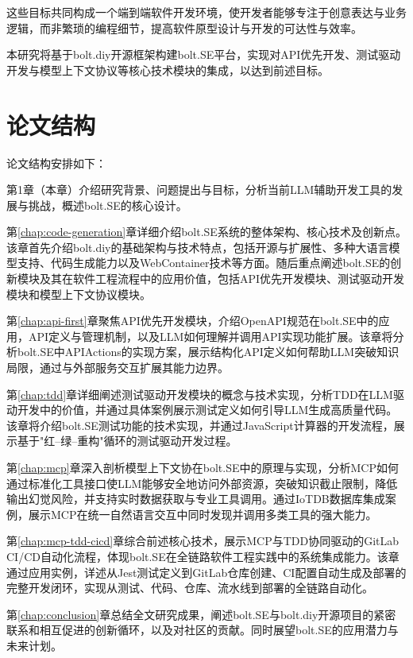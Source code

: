这些目标共同构成一个端到端软件开发环境，使开发者能够专注于创意表达与业务逻辑，而非繁琐的编程细节，提高软件原型设计与开发的可达性与效率。

本研究将基于bolt.diy开源框架构建bolt.SE平台，实现对API优先开发、测试驱动开发与模型上下文协议等核心技术模块的集成，以达到前述目标。

\section{论文结构}
论文结构安排如下：

第1章（本章）介绍研究背景、问题提出与目标，分析当前LLM辅助开发工具的发展与挑战，概述bolt.SE的核心设计。

第\ref{chap:code-generation}章详细介绍bolt.SE系统的整体架构、核心技术及创新点。该章首先介绍bolt.diy的基础架构与技术特点，包括开源与扩展性、多种大语言模型支持、代码生成能力以及WebContainer技术等方面。随后重点阐述bolt.SE的创新模块及其在软件工程流程中的应用价值，包括API优先开发模块、测试驱动开发模块和模型上下文协议模块。

第\ref{chap:api-first}章聚焦API优先开发模块，介绍OpenAPI规范在bolt.SE中的应用，API定义与管理机制，以及LLM如何理解并调用API实现功能扩展。该章将分析bolt.SE中APIActions的实现方案，展示结构化API定义如何帮助LLM突破知识局限，通过与外部服务交互扩展其能力边界。

第\ref{chap:tdd}章详细阐述测试驱动开发模块的概念与技术实现，分析TDD在LLM驱动开发中的价值，并通过具体案例展示测试定义如何引导LLM生成高质量代码。该章将介绍bolt.SE测试功能的技术实现，并通过JavaScript计算器的开发流程，展示基于"红–绿–重构"循环的测试驱动开发过程。

第\ref{chap:mcp}章深入剖析模型上下文协在bolt.SE中的原理与实现，分析MCP如何通过标准化工具接口使LLM能够安全地访问外部资源，突破知识截止限制，降低输出幻觉风险，并支持实时数据获取与专业工具调用。通过IoTDB数据库集成案例，展示MCP在统一自然语言交互中同时发现并调用多类工具的强大能力。

第\ref{chap:mcp-tdd-cicd}章综合前述核心技术，展示MCP与TDD协同驱动的GitLab CI/CD自动化流程，体现bolt.SE在全链路软件工程实践中的系统集成能力。该章通过应用实例，详述从Jest测试定义到GitLab仓库创建、CI配置自动生成及部署的完整开发闭环，实现从测试、代码、仓库、流水线到部署的全链路自动化。

第\ref{chap:conclusion}章总结全文研究成果，阐述bolt.SE与bolt.diy开源项目的紧密联系和相互促进的创新循环，以及对社区的贡献。同时展望bolt.SE的应用潜力与未来计划。